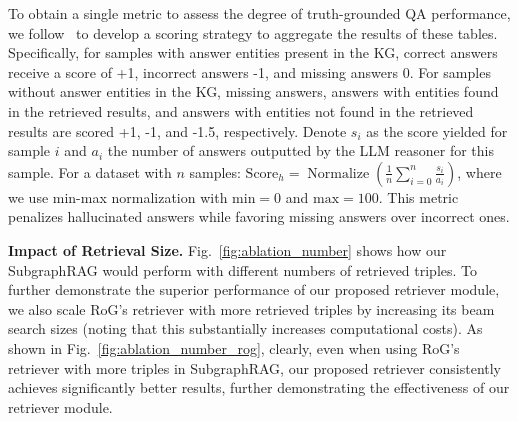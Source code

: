 To obtain a single metric to assess the degree of truth-grounded QA performance, we follow~\citep{yang2024crag} to develop a scoring strategy to aggregate the results of these tables. Specifically, for samples with answer entities present in the KG, correct answers receive a score of +1, incorrect answers -1, and missing answers 0. For samples without answer entities in the KG, missing answers, answers with entities found in the retrieved results, and answers with entities not found in the retrieved results are scored +1, -1, and -1.5, respectively. Denote $s_i$ as the score yielded for sample $i$ and $a_i$ the number of answers outputted by the LLM reasoner for this sample. For a dataset with $n$ samples:
$\text{Score}_{h} = \operatorname{Normalize} \left( \frac{1}{n} \sum_{i=0}^{n} \frac{s_i}{a_i} \right)$, where we use min-max normalization with $\text{min} = 0$ and $\text{max} = 100$. 
This metric penalizes hallucinated answers while favoring missing answers over incorrect ones.

\textbf{Impact of Retrieval Size.} Fig.~\ref{fig:ablation_number} shows how our SubgraphRAG would perform with different numbers of retrieved triples. To further demonstrate the superior performance of our proposed retriever module, we also scale RoG's retriever with more retrieved triples by increasing its beam search sizes (noting that this substantially increases computational costs). As shown in Fig.~\ref{fig:ablation_number_rog}, clearly, even when using RoG's retriever with more triples in SubgraphRAG, our proposed retriever consistently achieves significantly better results, further demonstrating the effectiveness of our retriever module. 

